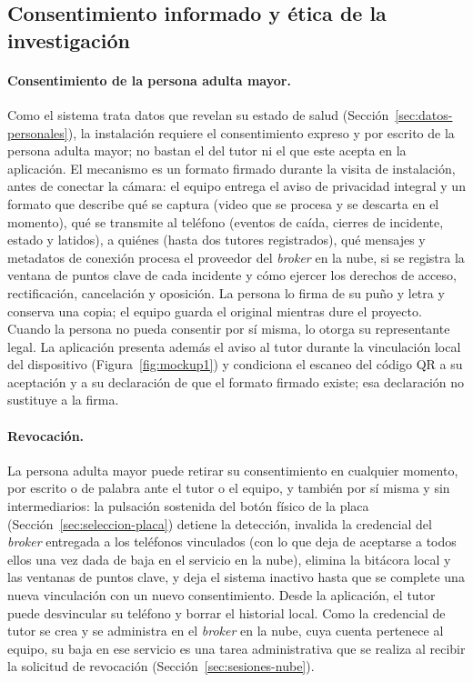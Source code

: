\documentclass[12pt,a4paper,oneside]{book}
\theoremstyle{plain}
\theoremstyle{definition}
\theoremstyle{remark}
\begin{document}
\subsection{Consentimiento informado y ética de la investigación}
\label{sec:consentimiento}

\paragraph{Consentimiento de la persona adulta mayor.} Como el sistema trata datos que revelan su estado de salud (Sección~\ref{sec:datos-personales}), la instalación requiere el consentimiento expreso y por escrito de la persona adulta mayor; no bastan el del tutor ni el que este acepta en la aplicación. El mecanismo es un formato firmado durante la visita de instalación, antes de conectar la cámara: el equipo entrega el aviso de privacidad integral y un formato que describe qué se captura (video que se procesa y se descarta en el momento), qué se transmite al teléfono (eventos de caída, cierres de incidente, estado y latidos), a quiénes (hasta dos tutores registrados), qué mensajes y metadatos de conexión procesa el proveedor del \textit{broker} en la nube, si se registra la ventana de puntos clave de cada incidente y cómo ejercer los derechos de acceso, rectificación, cancelación y oposición. La persona lo firma de su puño y letra y conserva una copia; el equipo guarda el original mientras dure el proyecto. Cuando la persona no pueda consentir por sí misma, lo otorga su representante legal. La aplicación presenta además el aviso al tutor durante la vinculación local del dispositivo (Figura~\ref{fig:mockup1}) y condiciona el escaneo del código QR a su aceptación y a su declaración de que el formato firmado existe; esa declaración no sustituye a la firma.

\paragraph{Revocación.} La persona adulta mayor puede retirar su consentimiento en cualquier momento, por escrito o de palabra ante el tutor o el equipo, y también por sí misma y sin intermediarios: la pulsación sostenida del botón físico de la placa (Sección~\ref{sec:seleccion-placa}) detiene la detección, invalida la credencial del \textit{broker} entregada a los teléfonos vinculados (con lo que deja de aceptarse a todos ellos una vez dada de baja en el servicio en la nube), elimina la bitácora local y las ventanas de puntos clave, y deja el sistema inactivo hasta que se complete una nueva vinculación con un nuevo consentimiento. Desde la aplicación, el tutor puede desvincular su teléfono y borrar el historial local. Como la credencial de tutor se crea y se administra en el \textit{broker} en la nube, cuya cuenta pertenece al equipo, su baja en ese servicio es una tarea administrativa que se realiza al recibir la solicitud de revocación (Sección~\ref{sec:sesiones-nube}).
\end{document}
